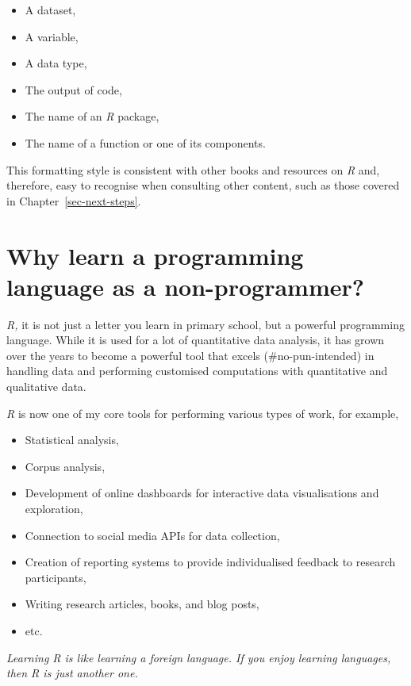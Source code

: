 \documentclass[
  letterpaper,
]{krantz}
\providecommand{\tightlist}{%
  \setlength{\itemsep}{0pt}\setlength{\parskip}{0pt}}\usepackage{longtable,booktabs,array}
\renewenvironment{quote}{\begin{VF}}{\end{VF}}
\begin{document}
\begin{itemize}
\item
  A dataset,
\item
  A variable,
\item
  A data type,
\item
  The output of code,
\item
  The name of an \emph{R} package,
\item
  The name of a function or one of its components.
\end{itemize}

This formatting style is consistent with other books and resources on
\emph{R} and, therefore, easy to recognise when consulting other
content, such as those covered in Chapter~\ref{sec-next-steps}.


\chapter{Why learn a programming language as a
non-programmer?}\label{sec-why-learn-a-programming-language-as-a-non-programmer}

\emph{R,} it is not just a letter you learn in primary school, but a
powerful programming language. While it is used for a lot of
quantitative data analysis, it has grown over the years to become a
powerful tool that excels (\#no-pun-intended) in handling data and
performing customised computations with quantitative and qualitative
data.

\emph{R} is now one of my core tools for performing various types of
work, for example,

\begin{itemize}
\tightlist
\item
  Statistical analysis,
\item
  Corpus analysis,
\item
  Development of online dashboards for interactive data visualisations
  and exploration,
\item
  Connection to social media APIs for data collection,
\item
  Creation of reporting systems to provide individualised feedback to
  research participants,
\item
  Writing research articles, books, and blog posts,
\item
  etc.
\end{itemize}

\begin{quote}
\emph{Learning R is like learning a foreign language. If you enjoy
learning languages, then R is just another one.}
\end{quote}
\end{document}
